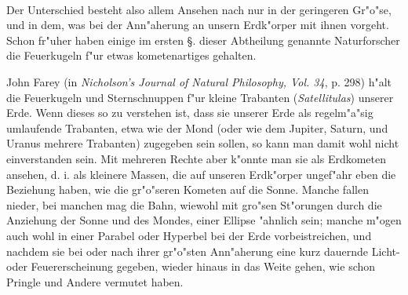 \documentclass[a4paper, 11pt, oneside, polutonikogreek, german]{article}
\begin{document}
\paragraph{}
Der Unterschied besteht also allem Ansehen nach nur in der geringeren Gr"o"se, und in dem, was bei der Ann"aherung an unsern Erdk"orper mit ihnen vorgeht. Schon fr"uher haben einige im ersten §. dieser Abtheilung genannte Naturforscher die Feuerkugeln f"ur etwas kometenartiges gehalten.

John Farey (in \emph{Nicholson's Journal of Natural Philosophy, Vol. 34}, p. 298) h"alt die Feuerkugeln und Sternschnuppen f"ur kleine Trabanten (\emph{Satellitulas}) unserer Erde. Wenn dieses so zu verstehen ist, dass sie unserer Erde als regelm"a"sig umlaufende Trabanten, etwa wie der Mond (oder wie dem Jupiter, Saturn, und Uranus mehrere Trabanten) zugegeben sein sollen, so kann man damit wohl nicht einverstanden sein. Mit mehreren Rechte aber k"onnte man sie als Erdkometen ansehen, d. i. als kleinere Massen, die auf unseren Erdk"orper ungef"ahr eben die Beziehung haben, wie die gr"o"seren Kometen auf die Sonne. Manche fallen nieder, bei manchen mag die Bahn, wiewohl mit gro"sen St"orungen durch die Anziehung der Sonne und des Mondes, einer Ellipse "ahnlich sein; manche m"ogen auch wohl in einer Parabel oder Hyperbel bei der Erde vorbeistreichen, und nachdem sie bei oder nach ihrer gr"o"sten Ann"aherung eine kurz dauernde Licht- oder Feuererscheinung gegeben, wieder hinaus in das Weite gehen, wie schon Pringle und Andere vermutet haben.
\subsection{}
\end{document}
